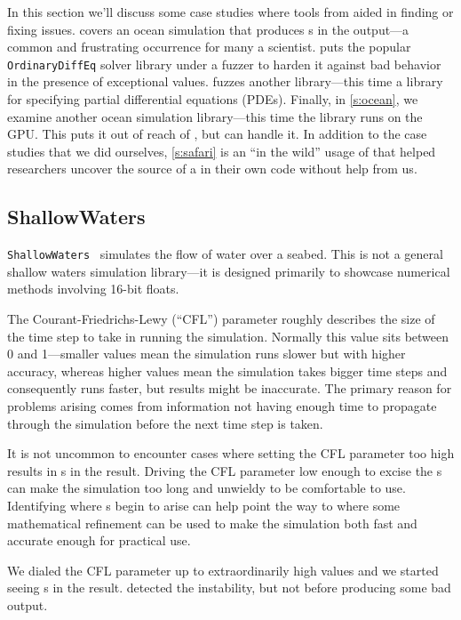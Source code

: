 \documentclass{juliacon}
\begin{document}
In this section we'll discuss some case studies where tools from \FlowFPX{} aided in finding or fixing \fp{} issues.
 covers an ocean simulation that produces \NaN{}s in the output---a common and frustrating occurrence for many a scientist.  puts the popular \texttt{OrdinaryDiffEq} solver library under a fuzzer to harden it against bad behavior in the presence of exceptional \fp{} values.  fuzzes another library---this time a library for specifying partial differential equations (PDEs). Finally, in \cref{s:ocean}, we examine another ocean simulation library---this time the library runs on the GPU. This puts it out of reach of \FT{}, but \GPUFPX{} can handle it. In addition to the case studies that we did ourselves, \cref{s:safari} is an ``in the wild'' usage of \FT{} that helped researchers uncover the source of a \NaN{} in their own code without help from us.

\subsection{ShallowWaters}
\label{s:sw}

\texttt{ShallowWaters}~\cite{klowerNumberFormatsError2020,klowerPositsAlternativeFloats2019,klowerLowprecisionClimateComputing2021} simulates the flow of water over a seabed.
This is not a general shallow waters simulation library---it is designed primarily to showcase numerical methods involving 16-bit floats.

The Courant-Friedrichs-Lewy (``CFL'') parameter roughly describes the size of the time step to take in running the simulation.
Normally this value sits between 0 and 1---smaller values mean the simulation runs slower but with higher accuracy, whereas higher values mean the simulation takes bigger time steps and consequently runs faster, but results might be inaccurate.
The primary reason for problems arising comes from information not having enough time to propagate through the simulation before the next time step is taken.

It is not uncommon to encounter cases where setting the CFL parameter too high results in \NaN{}s in the result.
Driving the CFL parameter low enough to excise the \NaN{}s can make the simulation too long and unwieldy to be comfortable to use.
Identifying where \NaN{}s begin to arise can help point the way to where some mathematical refinement can be used to make the simulation both fast and accurate enough for practical use.

We dialed the CFL parameter up to extraordinarily high values and we started seeing \NaN{}s in the result.
 detected the instability, but not before producing some bad output.
\end{document}
